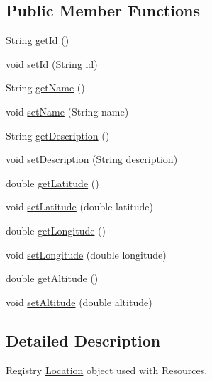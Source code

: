 \subsection*{Public Member Functions}
\begin{DoxyCompactItemize}
\item 
String \hyperlink{classeu_1_1h2020_1_1symbiote_1_1model_1_1Location_a98a3b93d177deb7b9630c5e37547d80d}{get\+Id} ()
\item 
void \hyperlink{classeu_1_1h2020_1_1symbiote_1_1model_1_1Location_a308f71eeeed57f22b5996da217028d29}{set\+Id} (String id)
\item 
String \hyperlink{classeu_1_1h2020_1_1symbiote_1_1model_1_1Location_a78e563a2622952f37da6f571932afa23}{get\+Name} ()
\item 
void \hyperlink{classeu_1_1h2020_1_1symbiote_1_1model_1_1Location_a67ddf61270deeb669ebcdce9b9ead998}{set\+Name} (String name)
\item 
String \hyperlink{classeu_1_1h2020_1_1symbiote_1_1model_1_1Location_accf0bb0ab10306a962e09fc32c8d821c}{get\+Description} ()
\item 
void \hyperlink{classeu_1_1h2020_1_1symbiote_1_1model_1_1Location_a45d3f8f4397791af93669578501a43bf}{set\+Description} (String description)
\item 
double \hyperlink{classeu_1_1h2020_1_1symbiote_1_1model_1_1Location_a40812abe56323ccb3e65d1309d2d55e4}{get\+Latitude} ()
\item 
void \hyperlink{classeu_1_1h2020_1_1symbiote_1_1model_1_1Location_a26b8aab258d4422bd5fc64d7a512b685}{set\+Latitude} (double latitude)
\item 
double \hyperlink{classeu_1_1h2020_1_1symbiote_1_1model_1_1Location_afe9ac4993b9dbcc9350e2667e279d39b}{get\+Longitude} ()
\item 
void \hyperlink{classeu_1_1h2020_1_1symbiote_1_1model_1_1Location_a6bc9a04947915ea52001bccbcba0849e}{set\+Longitude} (double longitude)
\item 
double \hyperlink{classeu_1_1h2020_1_1symbiote_1_1model_1_1Location_a333c37abcd3c9ea766ca5ec6dddd5e3a}{get\+Altitude} ()
\item 
void \hyperlink{classeu_1_1h2020_1_1symbiote_1_1model_1_1Location_ac2fc6d59229ad7253416f2fdf650675d}{set\+Altitude} (double altitude)
\end{DoxyCompactItemize}


\subsection{Detailed Description}
Registry \hyperlink{classeu_1_1h2020_1_1symbiote_1_1model_1_1Location}{Location} object used with Resources.

